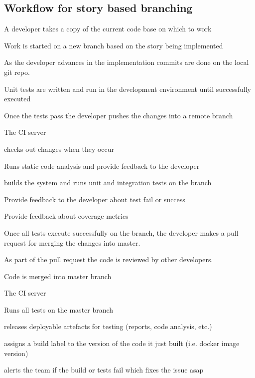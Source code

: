 \documentclass[a4paper,
               keeplastbox,   %
               ]{jacow}
\begin{document}
\subsection{Workflow for story based branching }
\begin{Itemize}
    \item A developer takes a copy of the current code base on which to work
    \item Work is started on a new branch based on the story being implemented
    \item As  the developer advances in the implementation commits are done on the local git repo. 
    \item Unit tests are written and run in the development environment until successfully executed
    \item Once the tests pass the developer pushes the changes into a remote branch
    \item The CI server 
    \begin{Itemize}
        \item checks out changes when they occur
        \item Runs static code analysis and provide feedback to the developer
        \item builds the system and runs unit and integration tests on the branch
        \item Provide feedback to the developer about test fail or success
        \item Provide feedback about coverage metrics
    \end{Itemize}
    \item Once all tests execute successfully on the branch, the developer makes a pull request for merging the changes into master.
    \item As part of the pull request the code is reviewed by other developers.
    \item Code is merged into master branch
    \item The CI server 
    \begin{Itemize}
        \item Runs all tests on the master branch
        \item releases deployable artefacts for testing (reports, code analysis, etc.)
        \item assigns a build label to the version of the code it just built (i.e. docker image version)
        \item alerts the team if the build or tests fail which fixes the issue asap
    \end{Itemize}
\end{Itemize}
\end{document}
